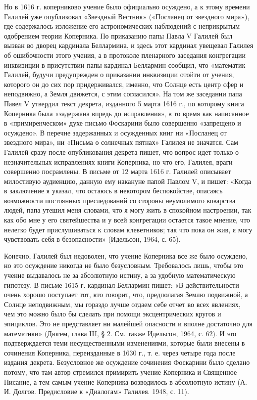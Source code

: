 Но  в  1616  г.  коперниково  учение было  официально  осуждено,  а  к
этому времени  Галилей уже  опубликовал «Звездный  Вестник» («Посланец
от  звездного мира»),  где содержалось  изложение его  астрономических
наблюдений с  неприкрытым одобрением  теории Коперника.  По приказанию
папы  Павла V  Галилей был  вызван во  дворец кардинала  Беллармина, и
здесь этот кардинал увещевал Галилея  об ошибочности этого учения, а в
протоколе  пленарного заседания  конгрегации инквизиции  в присутствии
папы  кардинал  Беллармин  сообщил,  что  «математик  Галилей,  будучи
предупрежден  о приказании  инквизиции отойти  от учения,  которого он
до  сих  пор придерживался,  именно,  что  Солнце  есть центр  сфер  и
неподвижно, а Земля движется, с  этим согласился». На том же заседании
папа Павел  V утвердил текст  декрета, изданного  5 марта 1616  г., по
которому книга Коперника была «задержана  впредь до исправления», в то
время  как написанное  в «примиренческом»  духе письмо  Фоскарини было
совершенно «запрещено и осуждено».  В перечне задержанных и осужденных
книг ни «Посланец  от звездного мира», ни «Письма  о солнечных пятнах»
Галилея  не значатся.  Сам Галилей  сразу после  опубликования декрета
пишет,  что вопрос  идет  только о  незначительных исправлениях  книги
Коперника, но что его, Галилея,  враги совершенно посрамлены. В письме
от 12 марта 1616 г. Галилей описывает милостивую аудиенцию, данную ему
накануне папой  Павлом V, и пишет:  «Когда в заключение я  указал, что
остаюсь  в  некотором  беспокойстве, опасаясь  возможности  постоянных
преследований со стороны неумолимого коварства людей, папа утешил меня
словами, что я могу жить в спокойном настроении, так как обо мне у его
святейшества и у  всей конгрегации остается такое  мнение, что нелегко
будет прислушиваться к словам клеветников; так что пока он жив, я могу
чувствовать себя в безопасности» (Идельсон, 1964, с. 65).

Конечно,  Галилей был  недоволен,  что учение  Коперника  все же  было
осуждено, но  это осуждение  никогда не было  безусловным. Требовалось
лишь,  чтобы это  учение  выдавалось  не за  абсолютную  истину, а  за
удобную математическую  гипотезу. В письме 1615  г. кардинал Беллармин
пишет: «В  действительности очень  хорошо поступает тот,  кто говорит,
что,  предполагая Землю  подвижной, а  Солнце неподвижным,  мы гораздо
лучше  отдаем  себе  отчет  во  всех  явлениях,  чем  это  можно  было
бы  сделать при  помощи  эксцентрических кругов  и  эпициклов. Это  не
представляет ни малейшей опасности и вполне достаточно для математики»
(Дюгем,  глава  III,  §  2.  См.  также  Идельсон,  1964,  с.  62).  И
это  подтверждается  теми  несущественными изменениями,  которые  были
внесены  в  сочинения  Коперника,  переизданные   в  1630  г.,  т.  е.
через  четыре года  после  издания декрета.  Безусловное же  осуждение
сочинения  Фоскарини  было сделано  потому,  что  там автор  стремился
примирить учение  Коперника и  Священное Писание,  а тем  самым учение
Коперника возводилось в абсолютную истину (А. И. Долгов. Предисловие к
«Диалогам» Галилея. 1948, с. 11).

